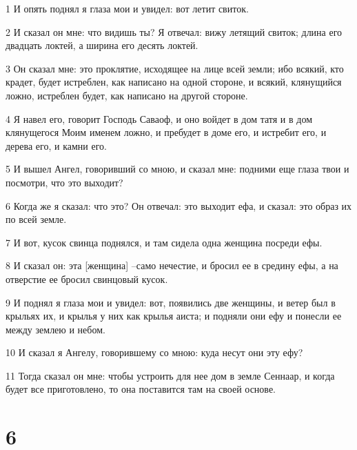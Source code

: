 \par 1 И опять поднял я глаза мои и увидел: вот летит свиток.
\par 2 И сказал он мне: что видишь ты? Я отвечал: вижу летящий свиток; длина его двадцать локтей, а ширина его десять локтей.
\par 3 Он сказал мне: это проклятие, исходящее на лице всей земли; ибо всякий, кто крадет, будет истреблен, как написано на одной стороне, и всякий, клянущийся ложно, истреблен будет, как написано на другой стороне.
\par 4 Я навел его, говорит Господь Саваоф, и оно войдет в дом татя и в дом клянущегося Моим именем ложно, и пребудет в доме его, и истребит его, и дерева его, и камни его.
\par 5 И вышел Ангел, говоривший со мною, и сказал мне: подними еще глаза твои и посмотри, что это выходит?
\par 6 Когда же я сказал: что это? Он отвечал: это выходит ефа, и сказал: это образ их по всей земле.
\par 7 И вот, кусок свинца поднялся, и там сидела одна женщина посреди ефы.
\par 8 И сказал он: эта [женщина] --само нечестие, и бросил ее в средину ефы, а на отверстие ее бросил свинцовый кусок.
\par 9 И поднял я глаза мои и увидел: вот, появились две женщины, и ветер был в крыльях их, и крылья у них как крылья аиста; и подняли они ефу и понесли ее между землею и небом.
\par 10 И сказал я Ангелу, говорившему со мною: куда несут они эту ефу?
\par 11 Тогда сказал он мне: чтобы устроить для нее дом в земле Сеннаар, и когда будет все приготовлено, то она поставится там на своей основе.

\chapter{6}


